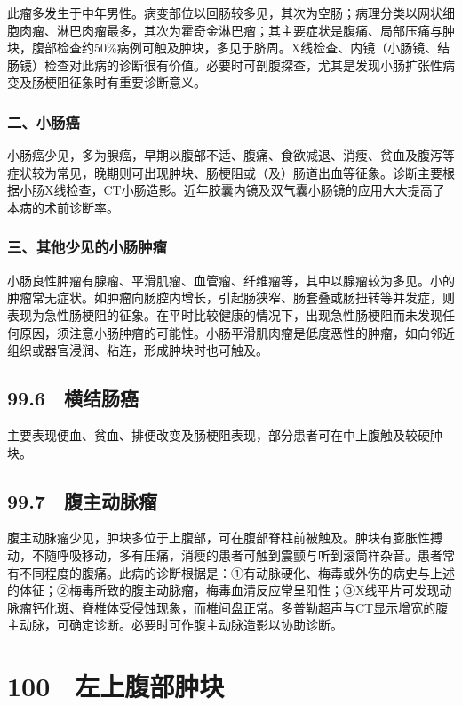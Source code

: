 此瘤多发生于中年男性。病变部位以回肠较多见，其次为空肠；病理分类以网状细胞肉瘤、淋巴肉瘤最多，其次为霍奇金淋巴瘤；其主要症状是腹痛、局部压痛与肿块，腹部检查约50\%病例可触及肿块，多见于脐周。X线检查、内镜（小肠镜、结肠镜）检查对此病的诊断很有价值。必要时可剖腹探查，尤其是发现小肠扩张性病变及肠梗阻征象时有重要诊断意义。

\subsubsection{二、小肠癌}

小肠癌少见，多为腺癌，早期以腹部不适、腹痛、食欲减退、消瘦、贫血及腹泻等症状较为常见，晚期则可出现肿块、肠梗阻或（及）肠道出血等征象。诊断主要根据小肠X线检查，CT小肠造影。近年胶囊内镜及双气囊小肠镜的应用大大提高了本病的术前诊断率。

\subsubsection{三、其他少见的小肠肿瘤}

小肠良性肿瘤有腺瘤、平滑肌瘤、血管瘤、纤维瘤等，其中以腺瘤较为多见。小的肿瘤常无症状。如肿瘤向肠腔内增长，引起肠狭窄、肠套叠或肠扭转等并发症，则表现为急性肠梗阻的征象。在平时比较健康的情况下，出现急性肠梗阻而未发现任何原因，须注意小肠肿瘤的可能性。小肠平滑肌肉瘤是低度恶性的肿瘤，如向邻近组织或器官浸润、粘连，形成肿块时也可触及。

\subsection{99.6　横结肠癌}

主要表现便血、贫血、排便改变及肠梗阻表现，部分患者可在中上腹触及较硬肿块。

\subsection{99.7　腹主动脉瘤}

腹主动脉瘤少见，肿块多位于上腹部，可在腹部脊柱前被触及。肿块有膨胀性搏动，不随呼吸移动，多有压痛，消瘦的患者可触到震颤与听到滚筒样杂音。患者常有不同程度的腹痛。此病的诊断根据是：①有动脉硬化、梅毒或外伤的病史与上述的体征；②梅毒所致的腹主动脉瘤，梅毒血清反应常呈阳性；③X线平片可发现动脉瘤钙化斑、脊椎体受侵蚀现象，而椎间盘正常。多普勒超声与CT显示增宽的腹主动脉，可确定诊断。必要时可作腹主动脉造影以协助诊断。

\protect\hypertarget{text00231.html}{}{}

\section{100　左上腹部肿块}

